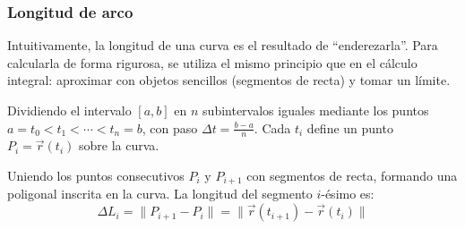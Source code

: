 \subsubsection{Longitud de arco}

Intuitivamente, la longitud de una curva es el resultado de ``enderezarla''. Para calcularla de forma rigurosa, se utiliza el mismo principio que en el cálculo integral: aproximar con objetos sencillos (segmentos de recta) y tomar un límite.

Dividiendo el intervalo $[a, b]$ en $n$ subintervalos iguales mediante los puntos $a = t_0 < t_1 < \cdots < t_n = b$, con paso $\Delta t = \frac{b-a}{n}$. Cada $t_i$ define un punto $P_i = \vec{r}(t_i)$ sobre la curva.

Uniendo los puntos consecutivos $P_i$ y $P_{i+1}$ con segmentos de recta, formando una poligonal inscrita en la curva. La longitud del segmento $i$-ésimo es:
\[ \Delta L_i = \|P_{i+1} - P_i\| = \|\vec{r}(t_{i+1}) - \vec{r}(t_i)\| \]

\begin{center}
\shorthandoff{>}
\end{center}

